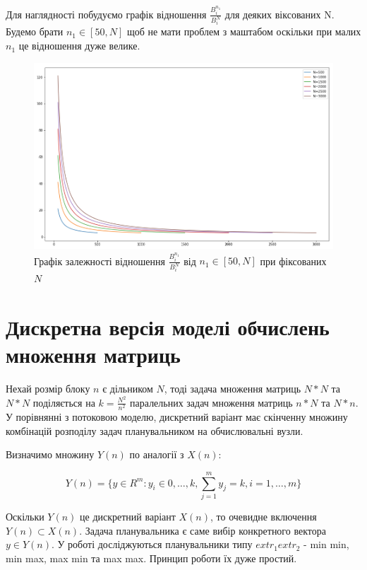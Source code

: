 Для наглядності побудуємо графік відношення $\frac{B_i^{n_1}}{B_i^{N}}$ для деяких віксованих N. Будемо брати $n_1 \in [50, N]$ щоб не мати проблем з маштабом оскільки при малих $n_1$ це відношення дуже велике.

\begin{figure}[H]
	\centering
	\includegraphics[width=\textwidth]{theory/img/B_times_diff_N}
	\caption{Графік залежності відношення $\frac{B_i^{n_1}}{B_i^{N}}$ від $n_1 \in [50, N]$ при фіксованих $N$ }
	\label{fig:one_diff_N}
\end{figure}

\section{Дискретна версія моделі обчислень множення матриць}
Нехай розмір блоку $n$ є дільником $N$, тоді задача множення матриць $N*N$ та $N*N$ поділяється на $k = \frac{N^2}{n^2}$ паралельних задач множення матриць $n*N$ та $N*n$.
У порівнянні з потоковою моделю, дискретний варіант має скінченну множину комбінацій розподілу задач планувальником на обчислювальні вузли.

Визначимо множину $Y(n)$ по аналогії з $X(n)$:

\begin{equation}
	\label{eq:Y(n)}
	Y(n) = \big\{y \in R^m : y_i \in {0, \ldots, k}, \sum_{j = 1}^{m} y_j = k, i = 1,\ldots,m \big\}
\end{equation}

Оскільки $Y(n)$ це дискретний варіант $X(n)$, то очевидне включення $Y(n) \subset X(n)$.
Задача планувальника є саме вибір конкретного вектора $y \in Y(n)$.
У роботі досліджуються планувальники типу $extr_1 extr_2$ - min min, min max, max min та max max. Принцип роботи їх дуже простий.

